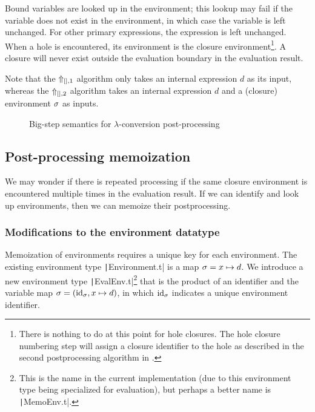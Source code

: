 Bound variables are looked up in the environment; this lookup may fail if the variable does not exist in the environment, in which case the variable is left unchanged. For other primary expressions, the expression is left unchanged. When a hole is encountered, its environment is the closure environment\footnote{There is nothing to do at this point for hole closures. The hole closure numbering step will assign a closure identifier to the hole as described in the second postprocessing algorithm in .}. A closure will never exist outside the evaluation boundary in the evaluation result.


Note that the $\Uparrow_{[],1}$ algorithm only takes an internal expression $d$ as its input, whereas the $\Uparrow_{[],2}$ algorithm takes an internal expression $d$ and a (closure) environment $\sigma$ as inputs.


\begin{figure}
  \centering
  \begin{mdframed}
    \begin{singlespace}
      
    \end{singlespace}
  \end{mdframed}
  \caption{Big-step semantics for $\lambda$-conversion post-processing}
  \label{fig:big-step-inside-formal}
\end{figure}

\subsection{Post-processing memoization}
\label{sec:memoization}

We may wonder if there is repeated processing if the same closure environment is encountered multiple times in the evaluation result. If we can identify and look up environments, then we can memoize their postprocessing.

\subsubsection{Modifications to the environment datatype}
\label{sec:memoization-evalenv}

Memoization of environments requires a unique key for each environment. The existing environment type \texttt|Environment.t| is a map $\sigma=x\mapsto d$. We introduce a new environment type \texttt|EvalEnv.t|\footnote{This is the name in the current implementation (due to this environment type being specialized for evaluation), but perhaps a better name is \texttt|MemoEnv.t|.} that is the product of an identifier and the variable map $\sigma=(\text{id}_\sigma,x\mapsto d)$, in which $\text{id}_\sigma$ indicates a unique environment identifier.

